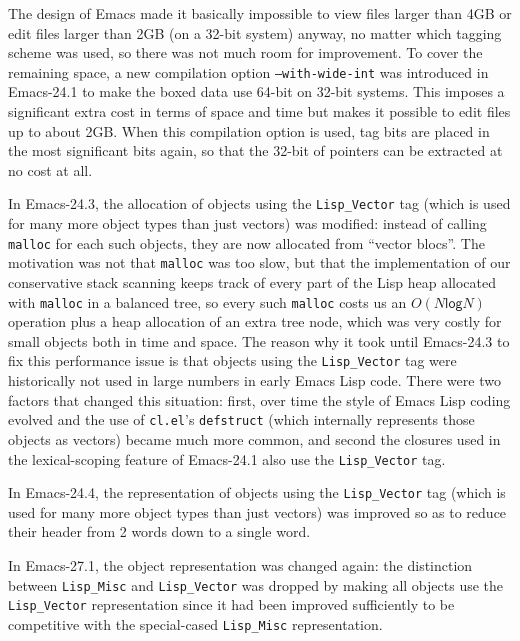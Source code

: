 \documentclass[format=acmsmall, review]{acmart}
\newcommand \Elisp {Emacs Lisp}
\begin{document}
The design of Emacs made it basically
impossible to view files larger than 4GB or edit files larger than 2GB (on
a 32-bit system) anyway, no matter which tagging scheme was used, so there was
not much room for improvement.
To cover the remaining space, a new compilation option
\texttt{--with-wide-int} was introduced in Emacs-24.1 to make the boxed data
use 64-bit on 32-bit systems.  This imposes a significant extra cost in terms
of space and time but makes it possible to edit files up to about 2GB.
When this compilation option is used, tag bits are placed in the most
significant bits again, so that the 32-bit of pointers can be extracted at no
cost at all.


In Emacs-24.3, the allocation of objects using the \texttt{Lisp\_Vector} tag
(which is used for many more object types than just vectors) was modified:
instead of calling \texttt{malloc} for each such objects, they are now
allocated from ``vector blocs''.  The motivation was not that
\texttt{malloc} was too slow, but that the implementation of our
conservative stack scanning keeps track of every part of the Lisp heap
allocated with \texttt{malloc} in a balanced tree, so every such
\texttt{malloc} costs us an $O(N \textsf{log} N)$ operation plus a heap
allocation of an extra tree node, which was very costly for small objects
both in time and space.  The reason why it took until Emacs-24.3 to fix this
performance issue is that objects using the \texttt{Lisp\_Vector} tag were
historically not used in large numbers in early \Elisp{} code.  There were
two factors that changed this situation: first, over time the style of
\Elisp{} coding evolved and the use of \texttt{cl.el}'s \texttt{defstruct}
(which internally represents those objects as vectors) became much more
common, and second the closures used in the lexical-scoping feature of
Emacs-24.1 also use the \texttt{Lisp\_Vector} tag.

In Emacs-24.4, the representation of objects using the \texttt{Lisp\_Vector}
tag (which is used for many more object types than just vectors) was
improved so as to reduce their header from 2 words down to a single word.

In Emacs-27.1, the object representation was changed again: the distinction
between \texttt{Lisp\_Misc} and \texttt{Lisp\_Vector} was dropped by making
all objects use the \texttt{Lisp\_Vector} representation since it had been
improved sufficiently to be competitive with the special-cased
\texttt{Lisp\_Misc} representation.
\end{document}
